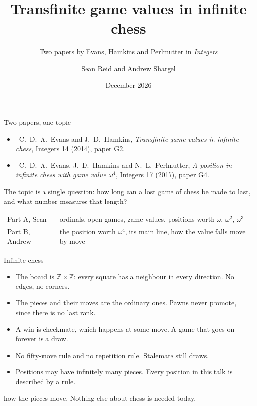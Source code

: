 \documentclass[aspectratio=169,10pt]{beamer}
\title[Transfinite game values in infinite chess]{Transfinite game values in infinite chess}
\subtitle{Two papers by Evans, Hamkins and Perlmutter in \emph{Integers}}
\author{Sean Reid and Andrew Shargel}
\institute{Introduction to Proofs, research paper presentation}
\date{December 2026}
\newcommand{\EH}{[EH14]}
\newcommand{\EHP}{[EHP17]}
\begin{document}

\begin{frame}[plain]
  \titlepage
\end{frame}

\begin{frame}{Two papers, one topic}
  \begin{itemize}
    \item \EH\ C.~D.~A.~Evans and J.~D.~Hamkins, \emph{Transfinite game values in infinite chess},
      Integers 14 (2014), paper G2.
    \item \EHP\ C.~D.~A.~Evans, J.~D.~Hamkins and N.~L.~Perlmutter,
      \emph{A position in infinite chess with game value $\omega^4$}, Integers 17 (2017), paper G4.
  \end{itemize}
  \vskip 0.4cm
  The topic is a single question: how long can a lost game of chess be made to last, and what number
  measures that length?
  \vskip 0.4cm
  \footnotesize
  \begin{tabular}{@{}ll@{}}
    \toprule
    Part A, Sean & ordinals, open games, game values, positions worth $\omega$, $\omega^2$, $\omega^3$ \\
    Part B, Andrew & the position worth $\omega^4$, its main line, how the value falls move by move \\
    \bottomrule
  \end{tabular}
\end{frame}

\begin{frame}{Infinite chess}
  \begin{itemize}
    \item The board is $\mathbb{Z}\times\mathbb{Z}$: every square has a neighbour in every direction. No edges, no corners.
    \item The pieces and their moves are the ordinary ones. Pawns never promote, since there is no last rank.
    \item A win is checkmate, which happens at some move. A game that goes on forever is a draw.
    \item No fifty-move rule and no repetition rule. Stalemate still draws.
    \item Positions may have infinitely many pieces. Every position in this talk is described by a rule.
  \end{itemize}
  \vskip 0.3cm
   how the pieces move. Nothing else about chess is needed today.
\end{frame}
\end{document}
